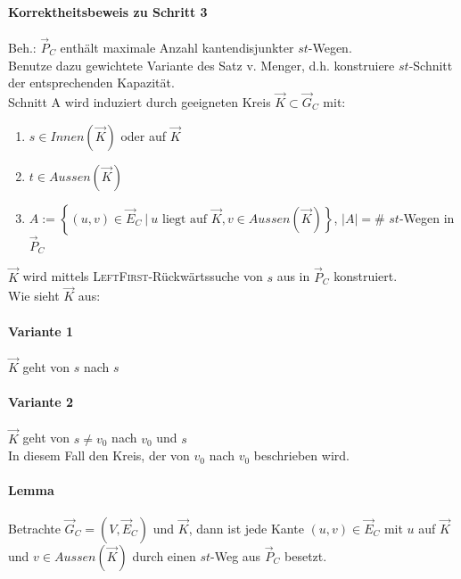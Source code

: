 \documentclass{article}
\newcommand{\set}[2]{\left\lbrace #1~|~#2 \right\rbrace}
\begin{document}
\paragraph{Korrektheitsbeweis zu Schritt 3}
Beh.: $\overrightarrow{P}_C$ enthält maximale Anzahl kantendisjunkter $st$-Wegen.\\
Benutze dazu gewichtete Variante des Satz v. Menger, d.h. konstruiere $st$-Schnitt der entsprechenden Kapazität.\\
Schnitt A wird induziert durch geeigneten Kreis $\overrightarrow{K} \subset \overrightarrow{G}_C$ mit:
\begin{enumerate}
	\item $s\in Innen(\overrightarrow{K})$ oder auf $\overrightarrow{K}$
	\item $t \in Aussen(\overrightarrow{K})$
	\item $A :=\set{(u,v)\in \overrightarrow{E}_C}{u \text{ liegt auf }\overrightarrow{K}, v \in Aussen(\overrightarrow{K})}$, $|A| = $\# $st$-Wegen in $\overrightarrow{P}_C$
\end{enumerate}

$\overrightarrow{K}$ wird mittels \textsc{LeftFirst}-Rückwärtssuche von $s$ aus in $\overrightarrow{P}_C$ konstruiert.\\
Wie sieht $\overrightarrow{K}$ aus:
\paragraph{Variante 1}
$\overrightarrow{K}$ geht von $s$ nach $s$
\paragraph{Variante 2}
$\overrightarrow{K}$ geht von $s \neq v_0$ nach $v_0$ und $s$\\
In diesem Fall den Kreis, der von $v_0$ nach $v_0$ beschrieben wird.

\paragraph{Lemma}
Betrachte $\overrightarrow{G}_C = (V,\overrightarrow{E}_C)$ und $\overrightarrow{K}$, dann ist jede Kante $(u,v) \in \overrightarrow{E}_C$ mit $u$ auf $\overrightarrow{K}$ und $v \in Aussen(\overrightarrow{K})$ durch einen $st$-Weg aus $\overrightarrow{P}_C$ besetzt.
\end{document}

